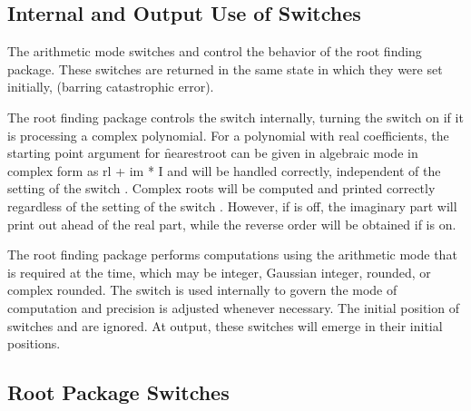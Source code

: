 \subsection{Internal and Output Use of Switches}

The {\REDUCE} arithmetic mode switches  and 
control the behavior of the root finding package.
These switches are returned in the same state in which they were set
initially, (barring catastrophic error).

\begin{description}
\item[\sw{complex}] The root finding package controls the switch 
internally, turning the switch on if it is processing a complex
polynomial.
For a polynomial with real coefficients, the
starting point argument for \f{nearestroot} can be given in algebraic mode in
complex form as rl + im * I and will be handled correctly, independent of
the setting of the switch . Complex roots will be computed
and printed correctly regardless of the setting of the switch .
However, if  is off, the imaginary part will print
out ahead of the real part, while the reverse order will be obtained if
 is on.

\item[\sw{rounded}] The
root finding package performs computations using the arithmetic mode that
is required at the time, which may be integer, Gaussian integer, rounded,
or complex rounded.  The switch  is used internally to govern
the mode of computation and precision is adjusted whenever necessary.  The
initial position of switches  and  are ignored.
At output, these switches will emerge in their initial positions.
\end{description}

\subsection{Root Package Switches}


